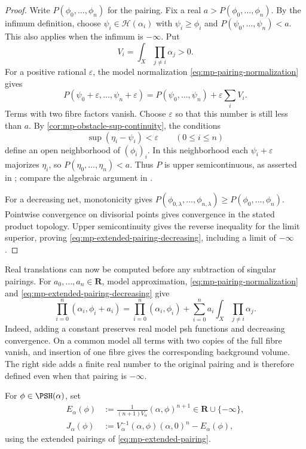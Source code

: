 \begin{proof}
Write $P(\phi_0,\ldots,\phi_n)$ for the pairing. Fix a real $a>P(\phi_0,\ldots,\phi_n)$. By the infimum definition, choose $\psi_i\in\mathcal H(\alpha_i)$ with $\psi_i\geq\phi_i$ and $P(\psi_0,\ldots,\psi_n)<a$. This also applies when the infimum is $-\infty$. Put
\[
 V_i=\int_X\prod_{j\ne i}\alpha_j>0.
\]
For a positive rational $\varepsilon$, the model normalization \eqref{eq:mp-pairing-normalization} gives
\[
 P(\psi_0+\varepsilon,\ldots,\psi_n+\varepsilon)
       =P(\psi_0,\ldots,\psi_n)+\varepsilon\sum_iV_i.
\]
Terms with two fibre factors vanish. Choose $\varepsilon$ so that this number is still less than $a$. By \cref{cor:mp-obstacle-sup-continuity}, the conditions
\[
             \sup(\eta_i-\psi_i)<\varepsilon
             \qquad(0\leq i\leq n)
\]
define an open neighborhood of $(\phi_i)_i$. In this neighborhood each $\psi_i+\varepsilon$ majorizes $\eta_i$, so $P(\eta_0,\ldots,\eta_n)<a$. Thus $P$ is upper semicontinuous, as asserted in \cite[Lemma~4.4.1, p.~42]{MPTropicalV2}; compare the algebraic argument in \cite[Theorem~7.1, pp.~747--748]{BJ22}.

For a decreasing net, monotonicity gives $P(\phi_{0,\lambda},\ldots,\phi_{n,\lambda})\geq P(\phi_0,\ldots,\phi_n)$. Pointwise convergence on divisorial points gives convergence in the stated product topology. Upper semicontinuity gives the reverse inequality for the limit superior, proving \eqref{eq:mp-extended-pairing-decreasing}, including a limit of $-\infty$.
\end{proof}

Real translations can now be computed before any subtraction of singular pairings. For $a_0,\ldots,a_n\in\mathbf R$, model approximation, \eqref{eq:mp-pairing-normalization} and \eqref{eq:mp-extended-pairing-decreasing} give
\[
 \prod_{i=0}^n(\alpha_i,\phi_i+a_i)
 =\prod_{i=0}^n(\alpha_i,\phi_i)
     +\sum_{i=0}^n a_i\int_X\prod_{j\ne i}\alpha_j.
\tag{60.18b}\label{eq:mp-extended-pairing-translation}
\]
Indeed, adding a constant preserves real model psh functions and decreasing convergence. On a common model all terms with two copies of the full fibre vanish, and insertion of one fibre gives the corresponding background volume. The right side adds a finite real number to the original pairing and is therefore defined even when that pairing is $-\infty$.

\begin{definition}\label{def:mp-energy-extended}
For $\phi\in\PSH(\alpha)$, set
\begin{align*}
 E_\alpha(\phi)&:=\frac1{(n+1)V_\alpha}(\alpha,\phi)^{n+1}
     \in\mathbf R\cup\{-\infty\},\\
 J_\alpha(\phi)&:=V_\alpha^{-1}(\alpha,\phi)(\alpha,0)^n-E_\alpha(\phi),
\end{align*}
using the extended pairings of \eqref{eq:mp-extended-pairing}.
\end{definition}

